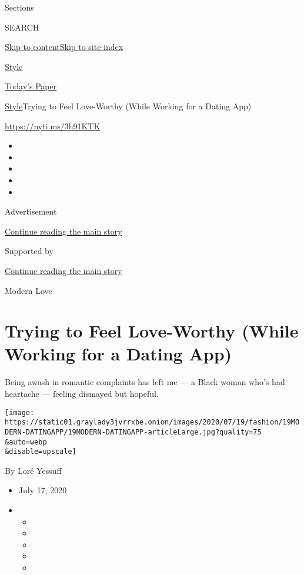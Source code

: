 Sections

SEARCH

\protect\hyperlink{site-content}{Skip to
content}\protect\hyperlink{site-index}{Skip to site index}

\href{https://www.nytimes3xbfgragh.onion/section/style}{Style}

\href{https://myaccount.nytimes3xbfgragh.onion/auth/login?response_type=cookie\&client_id=vi}{}

\href{https://www.nytimes3xbfgragh.onion/section/todayspaper}{Today's
Paper}

\href{/section/style}{Style}\textbar{}Trying to Feel Love-Worthy (While
Working for a Dating App)

\url{https://nyti.ms/3h91KTK}

\begin{itemize}
\item
\item
\item
\item
\item
\end{itemize}

Advertisement

\protect\hyperlink{after-top}{Continue reading the main story}

Supported by

\protect\hyperlink{after-sponsor}{Continue reading the main story}

Modern Love

\hypertarget{trying-to-feel-love-worthy-while-working-for-a-dating-app}{%
\section{Trying to Feel Love-Worthy (While Working for a Dating
App)}\label{trying-to-feel-love-worthy-while-working-for-a-dating-app}}

Being awash in romantic complaints has left me --- a Black woman who's
had heartache --- feeling dismayed but hopeful.

\texttt{[image: https://static01.graylady3jvrrxbe.onion/images/2020/07/19/fashion/19MODERN-DATINGAPP/19MODERN-DATINGAPP-articleLarge.jpg?quality=75\\\&auto=webp\\\&disable=upscale]}

By Loré Yessuff

\begin{itemize}
\item
  July 17, 2020
\item
  \begin{itemize}
  \item
  \item
  \item
  \item
  \item
  \end{itemize}
\end{itemize}

